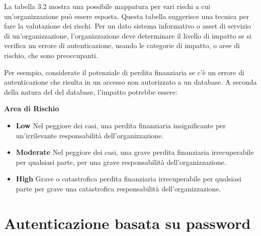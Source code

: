 La tabella 3.2 mostra una possibile mappatura per vari rischi a cui un'organizzazione può essere esposta. 
Questa tabella suggerisce una tecnica per fare la valutazione dei rischi. Per un dato sistema informativo o asset di servizio di un'organizzazione, l'organizzazione deve determinare il livello di impatto se si verifica un errore di autenticazione, usando le categorie di impatto, o aree di rischio, che sono preoccupanti. 

\singlespacing

Per esempio, considerate il potenziale di perdita finanziaria se c'è un errore di autenticazione che risulta in un accesso non autorizzato a un database. A seconda della natura del del database, l'impatto potrebbe essere:

\begin{center}
    \textbf{Area di Rischio}
\end{center}

\begin{itemize}
    \item \textbf{Low} Nel peggiore dei casi, una perdita finanziaria insignificante per un'irrilevante responsabilità dell'organizzazione.
    
    \item \textbf{Moderate} Nel peggiore dei casi, una grave perdita finanziaria irrecuperabile per qualsiasi parte, per una grave responsabilità dell'organizzazione.
    
    \item \textbf{High} Grave o catastrofica perdita finanziaria irrecuperabile per qualsiasi parte per grave una catastrofica responsabilità dell'organizzazione.
\end{itemize}
\newpage
\section{Autenticazione basata su password}

